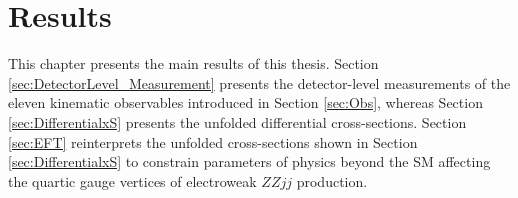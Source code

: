\part {\LARGE{Results}}
\label{sec:Results}

This chapter presents the main results of this thesis. Section \ref{sec:DetectorLevel_Measurement} presents the detector-level measurements of the eleven kinematic observables introduced in Section \ref{sec:Obs}, whereas Section \ref{sec:DifferentialxS} presents the unfolded differential cross-sections. Section \ref{sec:EFT} reinterprets the unfolded cross-sections shown in Section \ref{sec:DifferentialxS} to constrain parameters of physics beyond the SM affecting the quartic gauge vertices of electroweak $ZZjj$ production. 




